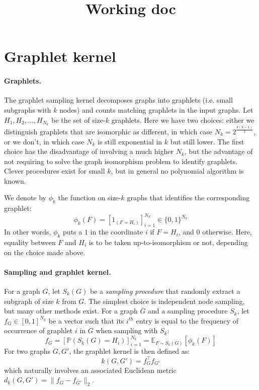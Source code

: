 \documentclass{article}
\title{Working doc}
\author{}
\date{}
\begin{document}
\maketitle

\section{Graphlet kernel}

\paragraph{Graphlets.} The graphlet sampling kernel decomposes graphs into graphlets (i.e. small subgraphs
with $k$ nodes) and counts matching graphlets in the input graphs. Let $H_1 , H_2 , \ldots , H_{N_k}$ be the set of size-$k$ graphlets. Here we have two choices: either we distinguish graphlets that are isomorphic as different, in which case $N_k = 2^{\frac{k(k-1)}{2}}$, or we don't, in which case $N_k$ is still exponential in $k$ but still lower. The first choice has the disadvantage of involving a much higher $N_k$, but the advantage of not requiring to solve the graph isomorphism problem to identify graphlets. Clever procedures exist for small $k$, but in general no polynomial algorithm is known.

We denote by $\phi_k$ the function on size-$k$ graphs that identifies the corresponding graphlet:
\[
\phi_k(F) = \left[ 1_{(F = H_i)}\right]_{i=1}^{N_k} \in \{0,1\}^{N_k}
\]
In other words, $\phi_k$ puts a $1$ in the coordinate $i$ if $F=H_i$, and $0$ otherwise. Here, equality between $F$ and $H_i$ is to be taken up-to-isomorphism or not, depending on the choice made above.

\paragraph{Sampling and graphlet kernel.} For a graph $G$, let $S_k(G)$ be a \emph{sampling procedure} that randomly extract a subgraph of size $k$ from $G$. The simplest choice is independent node sampling, but many other methods exist. For a graph $G$ and a sampling procedure $S_k$, let $f_G \in [0,1]^{N_k}$ be a vector such that its $i^{th}$ entry is equal to the frequency of
occurrence of graphlet $i$ in $G$ when sampling with $S_k$:
\[
f_G = \left[\mathbb{P}(S_k(G) = H_i)\right]_{i=1}^{N_k} = \mathbb{E}_{F \sim S_k(G)} [\phi_k(F)]
\]
For two graphs $G,G'$, the graphlet kernel is then defined as:
\begin{equation} \label{eq:graphlet_kernel}
k(G , G') = f_{G}^\top f_{G'}
\end{equation}
which naturally involves an associated Euclidean metric $d_k(G,G') = \|f_G - f_{G'}\|_2$.
\end{document}
